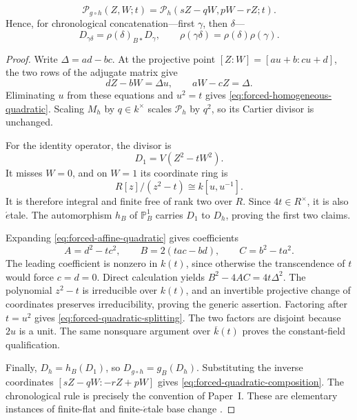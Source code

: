 \begin{theorem}
\begin{enumerate}
\begin{equation}
 \mathcal P_{g\circ h}(Z,W;t)
 =\mathcal P_h(sZ-qW,pW-rZ;t).
 \label{eq:forced-quadratic-composition}
\end{equation}
Hence, for chronological concatenation---first \(\gamma\), then \(\delta\)---
\begin{equation}
 D_{\gamma\delta}=\rho(\delta)_{B*}D_\gamma,
 \qquad
 \rho(\gamma\delta)=\rho(\delta)\rho(\gamma).
 \label{eq:history-divisor-chronology}
\end{equation}
\end{enumerate}
\end{theorem}

\begin{proof}
Write \(\Delta=ad-bc\).  At the projective point
\([Z:W]=[au+b:cu+d]\), the two rows of the adjugate matrix give
\[
 dZ-bW=\Delta u,
 \qquad
 aW-cZ=\Delta.
\]
Eliminating \(u\) from these equations and \(u^2=t\) gives
\eqref{eq:forced-homogeneous-quadratic}.  Scaling \(M_h\) by
\(q\in k^\times\) scales \(\mathcal P_h\) by \(q^2\), so its Cartier divisor
is unchanged.

For the identity operator, the divisor is
\[
 D_1=V(Z^2-tW^2).
\]
It misses \(W=0\), and on \(W=1\) its coordinate ring is
\[
 R[z]/(z^2-t)\cong k[u,u^{-1}].
\]
It is therefore integral and finite free of rank two over \(R\).  Since
\(4t\in R^\times\), it is also \(\acute{e}\)tale.  The automorphism \(h_B\) of
\(\mathbb P^1_B\) carries \(D_1\) to \(D_h\), proving the first two claims.

Expanding \eqref{eq:forced-affine-quadratic} gives coefficients
\[
 A=d^2-tc^2,\qquad B=2(tac-bd),\qquad C=b^2-ta^2.
\]
The leading coefficient is nonzero in \(k(t)\), since otherwise the
transcendence of \(t\) would force \(c=d=0\).  Direct calculation yields
\(B^2-4AC=4t\Delta^2\).  The polynomial \(z^2-t\) is irreducible over
\(k(t)\), and an invertible projective change of coordinates preserves
irreducibility, proving the generic assertion.  Factoring after \(t=u^2\)
gives \eqref{eq:forced-quadratic-splitting}.  The two factors are disjoint
because \(2u\) is a unit.  The same nonsquare argument over
\(\overline k(t)\) proves the constant-field qualification.

Finally, \(D_h=h_B(D_1)\), so \(D_{g\circ h}=g_B(D_h)\).  Substituting the
inverse coordinates
\([sZ-qW:-rZ+pW]\) gives
\eqref{eq:forced-quadratic-composition}.  The chronological rule is precisely
the convention of Paper~I.  These are elementary instances of finite-flat and
finite-\(\acute{e}\)tale base change
\cite{Hartshorne1977AlgebraicGeometry,GrothendieckRaynaud1971SGA1}.
\end{proof}

